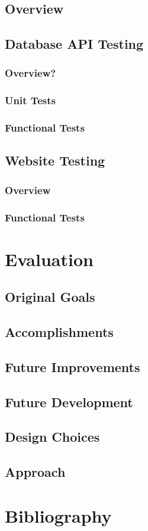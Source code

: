 \documentclass[11pt]{article}
\begin{document}
	\subsection{Overview}
	\subsection{Database API Testing}
		\subsubsection{Overview?}
		\subsubsection{Unit Tests}
		\subsubsection{Functional Tests}
	\subsection{Website Testing}
		\subsubsection{Overview}
		\subsubsection{Functional Tests}
		
\section{Evaluation}
	\subsection{Original Goals}
	\subsection{Accomplishments}
	\subsection{Future Improvements}
	\subsection{Future Development}
	\subsection{Design Choices}
	\subsection{Approach}
	
\section{Bibliography}
	
\end{document}

